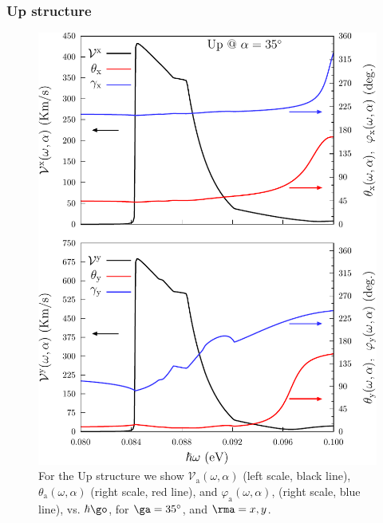 \documentclass[prb,11pt,tightenlines,twocolumn,aps]{revtex4-1}
\begin{document}
\subsubsection{Up structure}

\begin{figure}[t]
\centering
\includegraphics[width=\linewidth]{upplots/up-vx-vy-w1}
\caption{For the Up structure we show
$\mathcal{V}_{\mathrm{a}} (\omega,\alpha)$
(left scale, black line),  
$\theta_{\mathrm{a}} (\omega,\alpha)$
(right scale, red line), and
$\varphi_{\mathrm{a}} (\omega,\alpha)$,
(right scale, blue line),
vs. $\hbar\go$, for $\ga=35^\circ$, 
and $\rma=x,y$.
}
\label{fig:up-vab-comp-rtp-1}
\end{figure}
\end{document}

